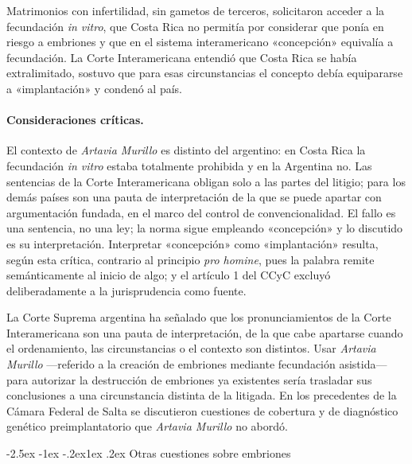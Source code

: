 \documentclass[12pt,oneside]{book}
\makeatletter
\renewcommand\subsection{\@startsection{subsection}{2}{\z@}%
  {-2.5ex \@plus -1ex \@minus -.2ex}{1ex \@plus .2ex}%
  {\normalfont\normalsize\bfseries}}
\makeatother
\begin{document}
\begin{ejemplo}
Matrimonios con infertilidad, sin gametos de terceros, solicitaron acceder a la fecundación \textit{in vitro}, que Costa Rica no permitía por considerar que ponía en riesgo a embriones y que en el sistema interamericano «concepción» equivalía a fecundación. La Corte Interamericana entendió que Costa Rica se había extralimitado, sostuvo que para esas circunstancias el concepto debía equipararse a «implantación» y condenó al país.
\end{ejemplo}

\paragraph{Consideraciones críticas.} El contexto de \textit{Artavia Murillo} es distinto del argentino: en Costa Rica la fecundación \textit{in vitro} estaba totalmente prohibida y en la Argentina no. Las sentencias de la Corte Interamericana obligan solo a las partes del litigio; para los demás países son una pauta de interpretación de la que se puede apartar con argumentación fundada, en el marco del control de convencionalidad. El fallo es una sentencia, no una ley; la norma sigue empleando «concepción» y lo discutido es su interpretación. Interpretar «concepción» como «implantación» resulta, según esta crítica, contrario al principio \textit{pro homine}, pues la palabra remite semánticamente al inicio de algo; y el artículo 1 del CCyC excluyó deliberadamente a la jurisprudencia como fuente.

\begin{importante}
La Corte Suprema argentina ha señalado que los pronunciamientos de la Corte Interamericana son una pauta de interpretación, de la que cabe apartarse cuando el ordenamiento, las circunstancias o el contexto son distintos. Usar \textit{Artavia Murillo} ---referido a la creación de embriones mediante fecundación asistida--- para autorizar la destrucción de embriones ya existentes sería trasladar sus conclusiones a una circunstancia distinta de la litigada. En los precedentes de la Cámara Federal de Salta se discutieron cuestiones de cobertura y de diagnóstico genético preimplantatorio que \textit{Artavia Murillo} no abordó.
\end{importante}

\subsection{Otras cuestiones sobre embriones}
\end{document}
